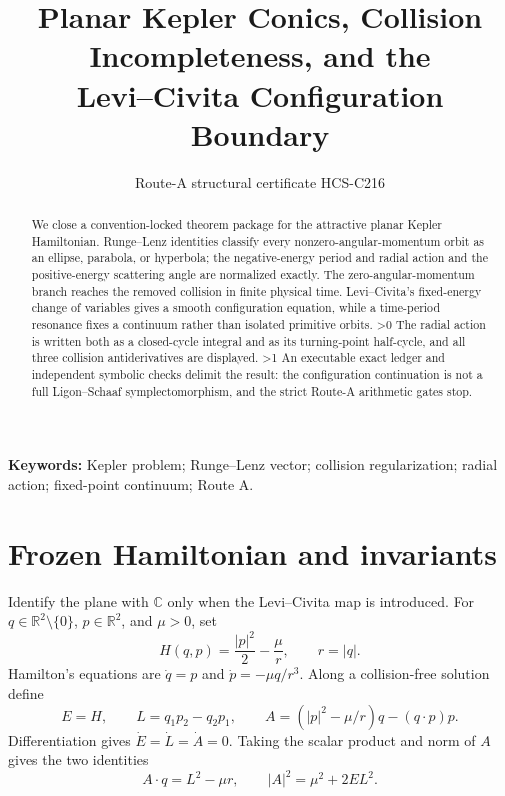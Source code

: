 \documentclass[9pt]{extarticle}
\title{Planar Kepler Conics, Collision Incompleteness, and the\\
Levi--Civita Configuration Boundary}
\author{Route-A structural certificate HCS-C216}
\date{}
\newcommand{\R}{\mathbb R}
\newcommand{\C}{\mathbb C}
\begin{document}
\maketitle
\begin{abstract}
We close a convention-locked theorem package for the attractive planar Kepler
Hamiltonian.  Runge--Lenz identities classify every nonzero-angular-momentum
orbit as an ellipse, parabola, or hyperbola; the negative-energy period and
radial action and the positive-energy scattering angle are normalized exactly.
The zero-angular-momentum branch reaches the removed collision in finite
physical time.  Levi--Civita's fixed-energy change of variables gives a smooth
configuration equation, while a time-period resonance fixes a continuum rather
than isolated primitive orbits.
\ifnum\CRevisionRound>0
The radial action is written both as a closed-cycle integral and as its
turning-point half-cycle, and all three collision antiderivatives are displayed.
\fi
\ifnum\CRevisionRound>1
An executable exact ledger and independent symbolic checks delimit the result:
the configuration continuation is not a full Ligon--Schaaf symplectomorphism,
and the strict Route-A arithmetic gates stop.
\fi
\end{abstract}
\noindent\textbf{Keywords:} Kepler problem; Runge--Lenz vector; collision
regularization; radial action; fixed-point continuum; Route A.

\section{Frozen Hamiltonian and invariants}
Identify the plane with \(\C\) only when the Levi--Civita map is introduced.
For \(q\in\R^2\setminus\{0\}\), \(p\in\R^2\), and \(\mu>0\), set
\begin{equation*}
 H(q,p)=\frac{|p|^2}{2}-\frac{\mu}{r},\qquad r=|q|.
\end{equation*}
Hamilton's equations are \(\dot q=p\) and \(\dot p=-\mu q/r^3\).  Along a
collision-free solution define
\begin{equation}
 E=H,\qquad L=q_1p_2-q_2p_1,\qquad
 A=(|p|^2-\mu/r)q-(q\!\cdot\!p)p .                         \tag{1}
\end{equation}
Differentiation gives \(\dot E=\dot L=\dot A=0\).  Taking the scalar product
and norm of \(A\) gives the two identities
\begin{equation}
 A\!\cdot q=L^2-\mu r,\qquad |A|^2=\mu^2+2EL^2 .          \tag{2}
\end{equation}
\end{document}
